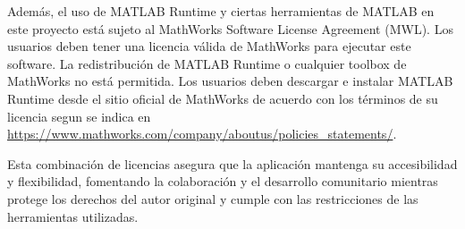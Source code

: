 Además, el uso de MATLAB Runtime y ciertas herramientas de MATLAB en este proyecto está sujeto al MathWorks Software License Agreement (MWL). Los usuarios deben tener una licencia válida de MathWorks para ejecutar este software. La redistribución de MATLAB Runtime o cualquier toolbox de MathWorks no está permitida. Los usuarios deben descargar e instalar MATLAB Runtime desde el sitio oficial de MathWorks de acuerdo con los términos de su licencia segun se indica en \url{https://www.mathworks.com/company/aboutus/policies_statements/}.

Esta combinación de licencias asegura que la aplicación mantenga su accesibilidad y flexibilidad, fomentando la colaboración y el desarrollo comunitario mientras protege los derechos del autor original y cumple con las restricciones de las herramientas utilizadas.

